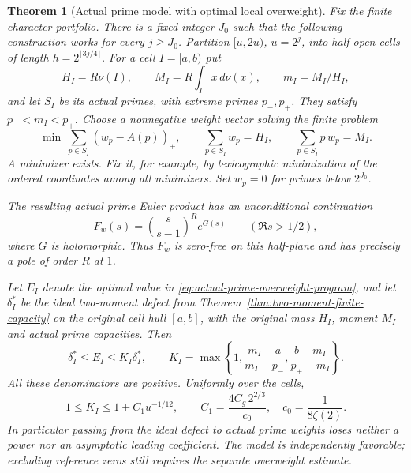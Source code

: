 \documentclass[11pt]{article}
\newtheorem{theorem}{Theorem}[section]
\theoremstyle{definition}
\begin{document}
\begin{theorem}[Actual prime model with optimal local overweight]
\label{thm:actual-favorable-prime-model}
Fix the finite character portfolio. There is a fixed integer $J_0$
such that the following construction works for every $j\ge J_0$.
Partition $[u,2u)$, $u=2^j$, into half-open cells of length
$h=2^{\lfloor3j/4\rfloor}$. For a cell $I=[a,b)$ put
\[
 H_I=R\nu(I),\qquad M_I=R\int_I x\,d\nu(x),\qquad m_I=M_I/H_I,
\]
and let $S_I$ be its actual primes, with extreme primes $p_-,p_+$.
They satisfy $p_-<m_I<p_+$.
Choose a nonnegative weight vector solving the finite problem
\begin{equation}
 \min\ \sum_{p\in S_I}(w_p-A(p))_+,\qquad
 \sum_{p\in S_I}w_p=H_I,\qquad
 \sum_{p\in S_I}p\,w_p=M_I .
 \label{eq:actual-prime-overweight-program}
\end{equation}
A minimizer exists. Fix it, for example, by lexicographic
minimization of the ordered coordinates among all minimizers.
Set $w_p=0$ for primes below $2^{J_0}$.

The resulting actual prime Euler product has an unconditional
continuation
\begin{equation}
 F_w(s)=\left(\frac{s}{s-1}\right)^R e^{G(s)}
                                  \qquad(\Re s>1/2),
 \label{eq:actual-favorable-prime-product}
\end{equation}
where $G$ is holomorphic. Thus $F_w$ is zero-free on this
half-plane and has precisely a pole of order $R$ at $1$.

Let $E_I$ denote the optimal value in
\eqref{eq:actual-prime-overweight-program}, and let $\delta_I^*$
be the ideal two-moment defect from
Theorem~\ref{thm:two-moment-finite-capacity} on the original
cell hull $[a,b]$, with the original mass $H_I$, moment $M_I$
and actual prime capacities. Then
\begin{equation}
 \delta_I^*\le E_I\le K_I\delta_I^*,\qquad
 K_I=\max\left\{1,\frac{m_I-a}{m_I-p_-},
                         \frac{b-m_I}{p_+-m_I}\right\}.
 \label{eq:actual-ideal-defect-comparison}
\end{equation}
All these denominators are positive. Uniformly over the cells,
\begin{equation}
 1\le K_I\le1+C_1u^{-1/12},\qquad
 C_1=\frac{4C_g\,2^{2/3}}{c_0},\quad c_0=\frac1{8\zeta(2)}.
 \label{eq:actual-prime-mesh-loss}
\end{equation}
In particular passing from the ideal defect to actual prime
weights loses neither a power nor an asymptotic leading coefficient.
The model is independently favorable; excluding reference zeros
still requires the separate overweight estimate.
\end{theorem}
\end{document}
